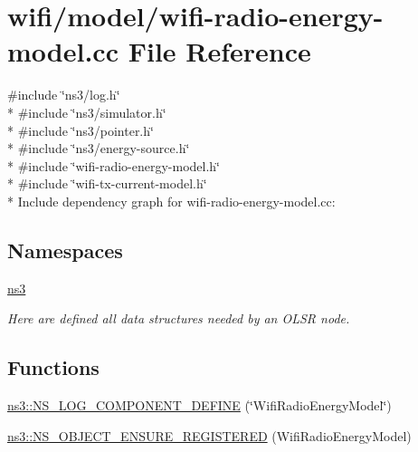 \hypertarget{wifi-radio-energy-model_8cc}{}\section{wifi/model/wifi-\/radio-\/energy-\/model.cc File Reference}
\label{wifi-radio-energy-model_8cc}
{\ttfamily \#include \char`\"{}ns3/log.\+h\char`\"{}}\\*
{\ttfamily \#include \char`\"{}ns3/simulator.\+h\char`\"{}}\\*
{\ttfamily \#include \char`\"{}ns3/pointer.\+h\char`\"{}}\\*
{\ttfamily \#include \char`\"{}ns3/energy-\/source.\+h\char`\"{}}\\*
{\ttfamily \#include \char`\"{}wifi-\/radio-\/energy-\/model.\+h\char`\"{}}\\*
{\ttfamily \#include \char`\"{}wifi-\/tx-\/current-\/model.\+h\char`\"{}}\\*
Include dependency graph for wifi-\/radio-\/energy-\/model.cc\+:
\subsection*{Namespaces}
\begin{DoxyCompactItemize}
\item 
 \hyperlink{namespacens3}{ns3}
\begin{DoxyCompactList}\small\item\em Here are defined all data structures needed by an O\+L\+SR node. \end{DoxyCompactList}\end{DoxyCompactItemize}
\subsection*{Functions}
\begin{DoxyCompactItemize}
\item 
\hyperlink{namespacens3_a52f7537a02fee96ade0eedfe3fcc2629}{ns3\+::\+N\+S\+\_\+\+L\+O\+G\+\_\+\+C\+O\+M\+P\+O\+N\+E\+N\+T\+\_\+\+D\+E\+F\+I\+NE} (\char`\"{}Wifi\+Radio\+Energy\+Model\char`\"{})
\item 
\hyperlink{namespacens3_a78182d8f6d5a7abee12510fe2525ada6}{ns3\+::\+N\+S\+\_\+\+O\+B\+J\+E\+C\+T\+\_\+\+E\+N\+S\+U\+R\+E\+\_\+\+R\+E\+G\+I\+S\+T\+E\+R\+ED} (Wifi\+Radio\+Energy\+Model)
\end{DoxyCompactItemize}
